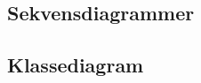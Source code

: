 \begin{flushleft}
\doublespacing
\subsection{Sekvensdiagrammer}
\subsection{Klassediagram}
\end{flushleft}